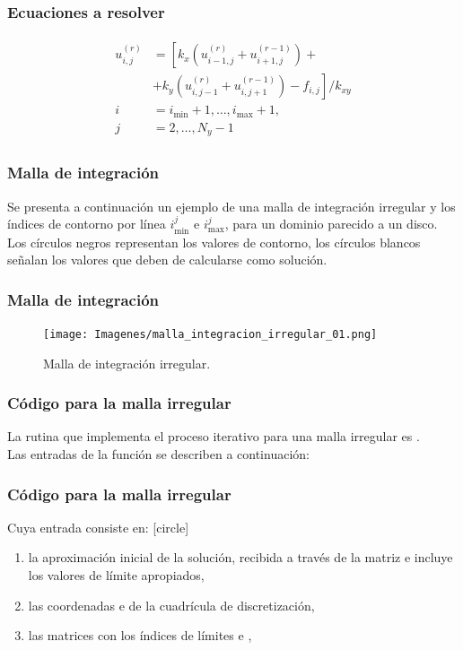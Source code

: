 \begin{frame}
\frametitle{Ecuaciones a resolver}
\begin{align}
\begin{aligned}
u_{i, j}^{(r)} &= \left[ k_{x} \left( u_{i-1, j}^{(r)} + u_{i+1, j}^{(r-1)} \right) + \right. \\[0.5em]
&\left. + k_{y} \left( u_{i, j-1}^{(r)} + u_{i, j+1}^{(r-1)} \right) - f_{i, j}  \right] / k_{x y} \\[0.5em]
i &= i_{\min} + 1, \ldots, i_{\max} + 1, \\[0.5em]
j &= 2, \ldots, N_{y} - 1
\end{aligned}
\label{eq:ecuacion_13_33}
\end{align}
\end{frame}
\begin{frame}
\frametitle{Malla de integración}
Se presenta a continuación un ejemplo de una malla de integración irregular y los índices de contorno por línea $i_{\min}^{j}$ e $i_{\max}^{j}$, para un dominio parecido a un disco.
\\
\bigskip
Los círculos negros representan los valores de contorno, los círculos blancos señalan los valores que deben de calcularse como solución.
\end{frame}
{
\begin{frame}
\frametitle{Malla de integración}
\begin{figure}[h!]
   \centering
   \texttt{[image: Imagenes/malla\_integracion\_irregular\_01.png]}
   \caption{Malla de integración irregular.}
\end{figure}
\end{frame}
}
\begin{frame}
\frametitle{Código para la malla irregular}
La rutina que implementa el proceso iterativo para una malla irregular es .
\\
\bigskip
Las entradas de la función se describen a continuación:
\end{frame}
\begin{frame}
\frametitle{Código para la malla irregular}
Cuya entrada consiste en:
[circle]
\begin{enumerate}[<+->]
\item la aproximación inicial de la solución, recibida a través de la matriz  e incluye los valores de límite apropiados,
\item las coordenadas  e  de la cuadrícula de discretización,
\item las matrices con los índices de límites  e ,
\seti
\end{enumerate}
\end{frame}
